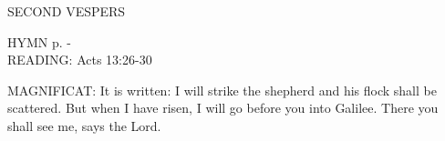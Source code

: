 \begin{flushleft}\normalsize{\uppercase{SECOND VESPERS\\}}\end{flushleft}
\small{\uppercase{HYMN} p. \pageref{palmsunday:firstHymn}-\pageref{palmsunday:lastHymn}\\}
\noindent\small READING:    Acts 13:26-30    \textbf{\\}

\noindent\small MAGNIFICAT:	It is written: I will strike the shepherd and his flock shall be scattered. But when I have risen, I will go before you into Galilee. There you shall see me, says the Lord.\\
